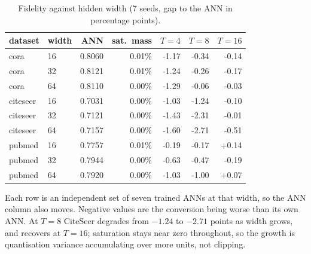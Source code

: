 \begin{table}[t]
\centering
\small
\caption{Fidelity against hidden width (7 seeds, gap to the ANN in percentage points).}
\label{tab:width}
\begin{tabular}{llrrrrr}
\toprule
dataset & width & ANN & sat.\ mass & $T=4$ & $T=8$ & $T=16$ \\
\midrule
cora & 16 & 0.8060 & 0.01\% & -1.17 & -0.34 & -0.14 \\
cora & 32 & 0.8121 & 0.01\% & -1.24 & -0.26 & -0.17 \\
cora & 64 & 0.8110 & 0.00\% & -1.29 & -0.06 & -0.03 \\
citeseer & 16 & 0.7031 & 0.00\% & -1.03 & -1.24 & -0.10 \\
citeseer & 32 & 0.7121 & 0.00\% & -1.43 & -2.31 & -0.01 \\
citeseer & 64 & 0.7157 & 0.00\% & -1.60 & -2.71 & -0.51 \\
pubmed & 16 & 0.7757 & 0.01\% & -0.19 & -0.17 & +0.14 \\
pubmed & 32 & 0.7944 & 0.00\% & -0.63 & -0.47 & -0.19 \\
pubmed & 64 & 0.7920 & 0.00\% & -1.03 & -1.00 & +0.07 \\
\bottomrule
\end{tabular}
\par\vspace{2pt}\footnotesize Each row is an independent set of seven trained ANNs at that width, so the ANN column also moves. Negative values are the conversion being worse than its own ANN. At $T=8$ CiteSeer degrades from $-1.24$ to $-2.71$ points as width grows, and recovers at $T=16$; saturation stays near zero throughout, so the growth is quantisation variance accumulating over more units, not clipping.
\end{table}
